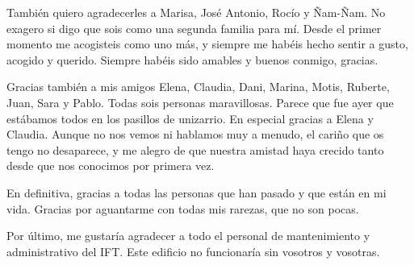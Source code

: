 También quiero agradecerles a Marisa, José Antonio, Rocío y Ñam-Ñam. No exagero si digo que sois como una segunda familia para mí. Desde el primer momento me acogisteis como uno más, y siempre me habéis hecho sentir a gusto, acogido y querido. Siempre habéis sido amables y buenos conmigo, gracias.

Gracias también a mis amigos Elena, Claudia, Dani, Marina, Motis, Ruberte, Juan, Sara y Pablo. Todas sois personas maravillosas. Parece que fue ayer que estábamos todos en los pasillos de unizarrio. En especial gracias a Elena y Claudia. Aunque no nos vemos ni hablamos muy a menudo, el cariño que os tengo no desaparece, y me alegro de que nuestra amistad haya crecido tanto desde que nos conocimos por primera vez.

En definitiva, gracias a todas las personas que han pasado y que están en mi vida. Gracias por aguantarme con todas mis rarezas, que no son pocas. 

Por último, me gustaría agradecer a todo el personal de mantenimiento y administrativo del IFT. Este edificio no funcionaría sin vosotros y vosotras.

\bigskip

\endgroup
